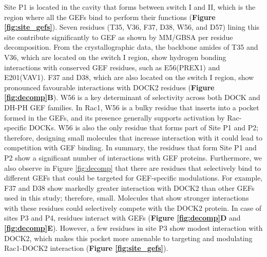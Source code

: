 \documentclass[12pt, a4paper]{achemso}
\begin{document}
Site P1 is located in the cavity that forms between switch I and II, which is the region where all the GEFs bind to perform their functions (\textbf{Figure \ref{fig:site_gefs}}). Seven residues (T35, V36, F37, D38, W56, and D57) lining this site contribute significantly to GEF as shown by MM/GBSA per residue decomposition. From the crystallographic data, the backbone amides of T35 and V36, which are located on the switch I region, show hydrogen bonding interactions with conserved GEF residues, such as E56(PREX1)\cite{prex1pdb} and E201(VAV1)\cite{vav1pdb}. F37 and D38, which are also located on the switch I region, show pronounced favourable interactions with DOCK2 residues (\textbf{Figure \ref{fig:decomp}B}). W56 is a key determinant of selectivity across both DOCK and DH-PH GEF families. In Rac1, W56 is a bulky residue that inserts into a pocket formed in the GEFs, and its presence generally supports activation by Rac-specific DOCKs. W56 is also the only residue that forms part of Site P1 and P2; therefore, designing small molecules that increase interaction with it could lead to competition with GEF binding. In summary, the residues that form Site P1 and P2 show a significant number of interactions with GEF proteins. Furthermore, we also observe in Figure \ref{fig:decomp} that there are residues that selectively bind to different GEFs that could be targeted for GEF-specific modulations. For example,  F37 and D38 show markedly greater interaction with DOCK2 than other GEFs used in this study; therefore, small. Molecules that show stronger interactions with these residues could selectively compete with the DOCK2 protein. In case of sites P3 and P4, residues interact with GEFs (\textbf{Figure \ref{fig:decomp}D} and \textbf{\ref{fig:decomp}E}). However, a few residues in site P3 show modest interaction with DOCK2, which makes this pocket more amenable to targeting and modulating Rac1-DOCK2 interaction (\textbf{Figure \ref{fig:site_gefs}}).
\end{document}
